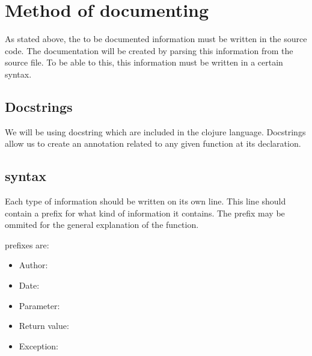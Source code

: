 \documentclass[12pt]{article}
\begin{document}
\section{Method of documenting}\label{method-of-documenting}

As stated above, the to be documented information must be written in the
source code. The documentation will be created by parsing this
information from the source file. To be able to this, this information
must be written in a certain syntax.

\subsection{Docstrings}\label{docstrings}

We will be using docstring which are included in the clojure language.
Docstrings allow us to create an annotation related to any given
function at its declaration.

\subsection{syntax}\label{syntax}

Each type of information should be written on its own line. This line
should contain a prefix for what kind of information it contains. The
prefix may be ommited for the general explanation of the function.

prefixes are:
\begin{itemize}
\item
Author:
\item
Date:
\item
Parameter:
\item
Return value:
\item
Exception:
\end{itemize}
\end{document}
